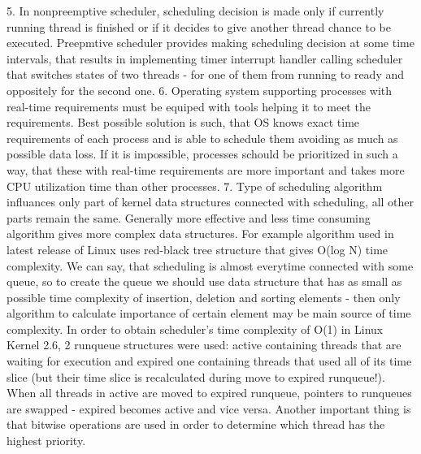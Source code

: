 5.
In nonpreemptive scheduler, scheduling decision is made only if currently running thread is finished or if it decides to give another thread chance to be executed. Preepmtive scheduler provides making scheduling decision at some time intervals, that results in implementing timer interrupt handler calling scheduler that switches states of two threads - for one of them from running to ready and oppositely for the second one.
6.
Operating system supporting processes with real-time requirements must be equiped with tools helping it to meet the requirements. Best possible solution is such, that OS knows exact time requirements of each process and is able to schedule them avoiding as much as possible data loss. If it is impossible, processes schould be prioritized in such a way, that these with real-time requirements are more important and takes more CPU utilization time than other processes.
7.
Type of scheduling algorithm influances only part of kernel data structures connected with scheduling, all other parts remain the same. Generally more effective and less time consuming algorithm gives more complex data structures. For example algorithm used in latest release of Linux uses red-black tree structure that gives O(log N) time complexity. We can say, that scheduling is almost everytime connected with some queue, so to create the queue we should use data structure that has as small as possible time complexity of insertion, deletion and sorting elements - then only algorithm to calculate importance of certain element may be main source of time complexity.
In order to obtain scheduler's time complexity of O(1) in Linux Kernel 2.6, 2 runqueue structures were used: active containing threads that are waiting for execution and expired one containing threads that used all of its time slice (but their time slice is recalculated during move to expired runqueue!). When all threads in active are moved to expired runqueue, pointers to runqueues are swapped - expired becomes active and vice versa. Another important thing is that bitwise operations are used in order to determine which thread has the highest priority.

